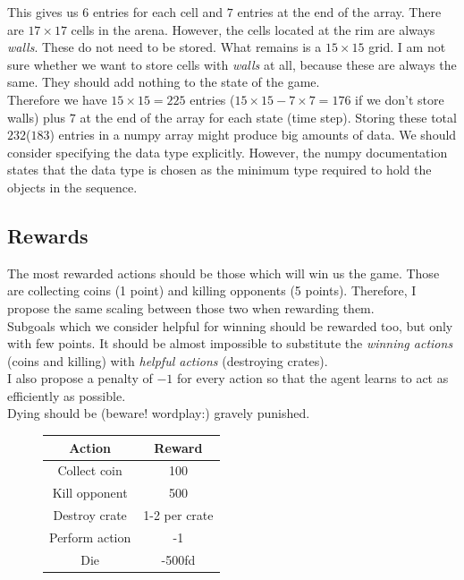\documentclass[12pt]{report}
\begin{document}
This gives us $6$ entries for each cell and $7$ entries at the end of the array. There are $17\times17$ cells in the arena. However, the cells located at the rim are always \textit{walls}. These do not need to be stored. What remains is a $15\times15$ grid. I am not sure whether we want to store cells with \textit{walls} at all, because these are always the same. They should add nothing to the state of the game.\\
Therefore we have $15\times15=225$ entries ($15\times15-7\times7=176$ if we don't store walls) plus $7$ at the end of the array for each state (time step). Storing these total $232$($183$) entries in a numpy array might produce big amounts of data. We should consider specifying the data type explicitly. However, the numpy documentation states that the data type is chosen as the minimum type required to hold the objects in the sequence.

\subsection{Rewards}
The most rewarded actions should be those which will win us the game. Those are collecting coins (1 point) and killing opponents (5 points). Therefore, I propose the same scaling between those two when rewarding them. \\
Subgoals which we consider helpful for winning should be rewarded too, but only with few points. It should be almost impossible to substitute the \textit{winning actions} (coins and killing) with \textit{helpful actions} (destroying crates). \\
I also propose a penalty of $-1$ for every action so that the agent learns to act as efficiently as possible. \\
Dying should be (beware! wordplay:) gravely punished. 
\begin{figure}[h]
	\centering
	\begin{tabular}{c|c}
		Action & Reward\\
		\toprule
		Collect coin & 100\\
		Kill opponent & 500\\
		Destroy crate & 1-2 per crate\\
		Perform action & -1\\
		Die & -500fd
	\end{tabular}
\end{figure}
\end{document}
